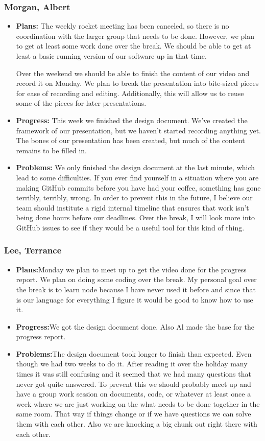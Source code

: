 \documentclass[10pt,draftclsnofoot,onecolumn]{IEEEtran}
\begin{document}
\subsubsection{Morgan, Albert}
\begin{itemize}
	\item \textbf{Plans: }
	The weekly rocket meeting has been canceled, so there is no coordination with the larger group that needs to be done. However, we plan to get at least some work done over the break. We should be able to get at least a basic running version of our software up in that time.
	
	Over the weekend we should be able to finish the content of our video and record it on Monday. We plan to break the presentation into bite-sized pieces for ease of recording and editing. Additionally, this will allow us to reuse some of the pieces for later presentations.
	\item \textbf{Progress: }
	This week we finished the design document. We've created the framework of our presentation, but we haven't started recording anything yet. The bones of our presentation has been created, but much of the content remains to be filled in.
	\item \textbf{Problems: }
	We only finished the design document at the last minute, which lead to some difficulties. If you ever find yourself in a situation where you are making GitHub commits before you have had your coffee, something has gone terribly, terribly, wrong. In order to prevent this in the future, I believe our team should institute a rigid internal timeline that ensures that work isn't being done hours before our deadlines. Over the break, I will look more into GitHub issues to see if they would be a useful tool for this kind of thing.
\end{itemize}
\subsubsection{Lee, Terrance}
\begin{itemize}
	\item \textbf{Plans:}Monday we plan to meet up to get the video done for the progress report.
We plan on doing some coding over the break. My personal goal over the break is to learn node because I have never used it before and since that is our language for everything I figure it would be good to know how to use it.
	\item \textbf{Progress:}We got the design document done. Also Al made the base for the progress report.
	\item \textbf{Problems:}The design document took longer to finish than expected. Even though we had two weeks to do it. After reading it over the holiday many times it was still confusing and it seemed that we had many questions that never got quite answered. To prevent this we should probably meet up and have a group work session on documents, code, or whatever at least once a week where we are just working on the what needs to be done together in the same room. That way if things change or if we have questions we can solve them with each other. Also we are knocking a big chunk out right there with each other.
\end{itemize}
\end{document}
